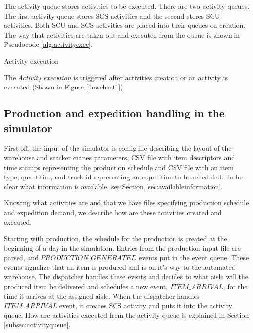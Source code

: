 \documentclass{ctuthesis}
\begin{document}
 The activity queue stores activities to be executed. There are two activity queues. The first activity queue stores SCS activities and the second stores SCU activities. Both SCU and SCS activities are placed into their queues on creation. The way that activities are taken out and executed from the queue is shown in Pseudocode \ref{alg:activityexec}.

\begin{algorithm}[H]
\SetAlgoLined
{
}
\caption{Activity execution}
\label{alg:activityexec}
\end{algorithm}

The \emph{Activity execution} is triggered after activities creation or an activity is executed (Shown in Figure \ref{flowchart1}).


\subsection{Production and expedition handling in the simulator}

First off, the input of the simulator is config file describing the layout of the warehouse and stacker cranes parameters, CSV file with item descriptors and time stamps representing the production schedule and CSV file with an item type, quantities, and truck id representing an expedition to be scheduled. To be clear what information is available, see Section \ref{sec:availableinformation}.

Knowing what activities are and that we have files specifying production schedule and expedition demand, we describe how are these activities created and executed.

Starting with production, the schedule for the production is created at the beginning of a day in the simulation. Entries from the production input file are parsed, and $PRODUCTION\_GENERATED$ events put in the event queue. These events signalize that an item is produced and is on it's way to the automated warehouse. The dispatcher handles these events and decides to what aisle will the produced item be delivered and schedules a new event, $ITEM\_ARRIVAL$, for the time it arrives at the assigned aisle. When the dispatcher handles $ITEM\_ARRIVAL$ event, it creates SCS activity and puts it into the activity queue. How are activities executed from the activity queue is explained in Section \ref{subsec:activityqueue}.
\end{document}

